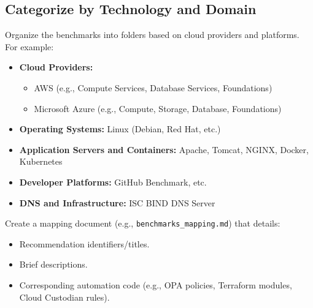 \documentclass[12pt]{article}
\begin{document}
\subsection{Categorize by Technology and Domain}
Organize the benchmarks into folders based on cloud providers and platforms. For example:
\begin{itemize}
    \item \textbf{Cloud Providers:}
    \begin{itemize}
        \item AWS (e.g., Compute Services, Database Services, Foundations)
        \item Microsoft Azure (e.g., Compute, Storage, Database, Foundations)
    \end{itemize}
    \item \textbf{Operating Systems:} Linux (Debian, Red Hat, etc.)
    \item \textbf{Application Servers and Containers:} Apache, Tomcat, NGINX, Docker, Kubernetes
    \item \textbf{Developer Platforms:} GitHub Benchmark, etc.
    \item \textbf{DNS and Infrastructure:} ISC BIND DNS Server
\end{itemize}

Create a mapping document (e.g., \texttt{benchmarks\_mapping.md}) that details:
\begin{itemize}
    \item Recommendation identifiers/titles.
    \item Brief descriptions.
    \item Corresponding automation code (e.g., OPA policies, Terraform modules, Cloud Custodian rules).
\end{itemize}
\end{document}
